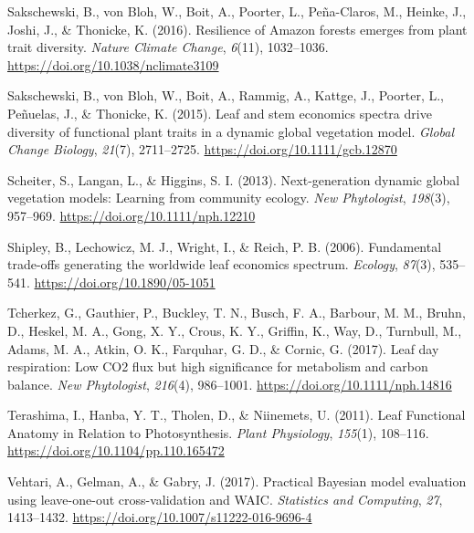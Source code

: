 \documentclass[
  12pt,
  letterpaper,
  DIV=11,
  numbers=noendperiod]{scrartcl}
\newlength{\cslhangindent}
\newlength{\cslentryspacingunit} %
\newenvironment{CSLReferences}[2] %
 {%
  \setlength{\parindent}{0pt}
  \ifodd #1
  \let\oldpar\par
  \def\par{\hangindent=\cslhangindent\oldpar}
  \fi
  \setlength{\parskip}{#2\cslentryspacingunit}
 }%
 {}
\begin{document}
\begin{CSLReferences}{1}{0}
\leavevmode{}%
Sakschewski, B., von Bloh, W., Boit, A., Poorter, L., Peña-Claros, M.,
Heinke, J., Joshi, J., \& Thonicke, K. (2016). Resilience of {Amazon}
forests emerges from plant trait diversity. \emph{Nature Climate
Change}, \emph{6}(11), 1032--1036.
\url{https://doi.org/10.1038/nclimate3109}

\leavevmode{}%
Sakschewski, B., von Bloh, W., Boit, A., Rammig, A., Kattge, J.,
Poorter, L., Peñuelas, J., \& Thonicke, K. (2015). Leaf and stem
economics spectra drive diversity of functional plant traits in a
dynamic global vegetation model. \emph{Global Change Biology},
\emph{21}(7), 2711--2725. \url{https://doi.org/10.1111/gcb.12870}

\leavevmode{}%
Scheiter, S., Langan, L., \& Higgins, S. I. (2013). Next-generation
dynamic global vegetation models: {Learning} from community ecology.
\emph{New Phytologist}, \emph{198}(3), 957--969.
\url{https://doi.org/10.1111/nph.12210}

\leavevmode{}%
Shipley, B., Lechowicz, M. J., Wright, I., \& Reich, P. B. (2006).
Fundamental trade-offs generating the worldwide leaf economics spectrum.
\emph{Ecology}, \emph{87}(3), 535--541.
\url{https://doi.org/10.1890/05-1051}

\leavevmode{}%
Tcherkez, G., Gauthier, P., Buckley, T. N., Busch, F. A., Barbour, M.
M., Bruhn, D., Heskel, M. A., Gong, X. Y., Crous, K. Y., Griffin, K.,
Way, D., Turnbull, M., Adams, M. A., Atkin, O. K., Farquhar, G. D., \&
Cornic, G. (2017). Leaf day respiration: Low {CO2} flux but high
significance for metabolism and carbon balance. \emph{New Phytologist},
\emph{216}(4), 986--1001. \url{https://doi.org/10.1111/nph.14816}

\leavevmode{}%
Terashima, I., Hanba, Y. T., Tholen, D., \& Niinemets, U. (2011). Leaf
{Functional Anatomy} in {Relation} to {Photosynthesis}. \emph{Plant
Physiology}, \emph{155}(1), 108--116.
\url{https://doi.org/10.1104/pp.110.165472}

\leavevmode{}%
Vehtari, A., Gelman, A., \& Gabry, J. (2017). Practical {Bayesian} model
evaluation using leave-one-out cross-validation and {WAIC}.
\emph{Statistics and Computing}, \emph{27}, 1413--1432.
\url{https://doi.org/10.1007/s11222-016-9696-4}


\end{CSLReferences}
\end{document}
